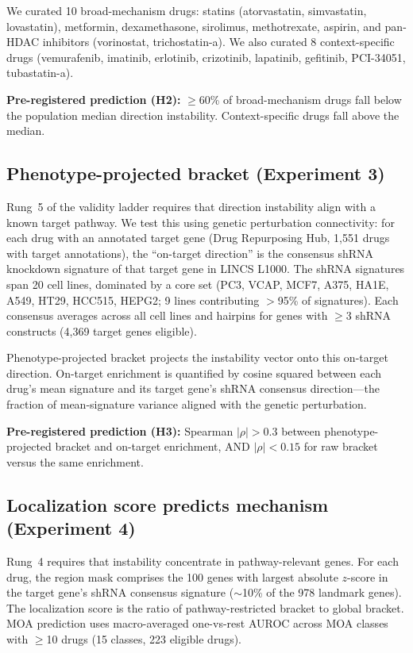 \documentclass{article}
\begin{document}
We curated 10 broad-mechanism drugs: statins (atorvastatin, simvastatin,
lovastatin), metformin, dexamethasone, sirolimus, methotrexate, aspirin,
and pan-HDAC inhibitors (vorinostat, trichostatin-a). We also curated 8
context-specific drugs (vemurafenib, imatinib, erlotinib, crizotinib,
lapatinib, gefitinib, PCI-34051, tubastatin-a).

\textbf{Pre-registered prediction (H2):} $\geq$60\% of broad-mechanism drugs
fall below the population median direction instability. Context-specific
drugs fall above the median.

\subsection{Phenotype-projected bracket (Experiment 3)}

Rung~5 of the validity ladder requires that direction instability align with
a known target pathway. We test this using genetic perturbation connectivity:
for each drug with an annotated target gene (Drug Repurposing Hub,
1{,}551 drugs with target annotations), the ``on-target direction'' is the
consensus shRNA knockdown signature of that target gene in LINCS L1000.
The shRNA signatures span 20 cell lines, dominated by a core set
(PC3, VCAP, MCF7, A375, HA1E, A549, HT29, HCC515, HEPG2; 9 lines
contributing $>$95\% of signatures). Each consensus averages across all
cell lines and hairpins for genes with $\geq$3 shRNA constructs
(4{,}369 target genes eligible).

Phenotype-projected bracket projects the instability vector onto this
on-target direction. On-target enrichment is quantified by cosine squared
between each drug's mean signature and its target gene's shRNA consensus
direction---the fraction of mean-signature variance aligned with the
genetic perturbation.

\textbf{Pre-registered prediction (H3):} Spearman $|\rho| > 0.3$ between
phenotype-projected bracket and on-target enrichment, AND $|\rho| < 0.15$
for raw bracket versus the same enrichment.

\subsection{Localization score predicts mechanism (Experiment 4)}

Rung~4 requires that instability concentrate in pathway-relevant genes.
For each drug, the region mask comprises the 100 genes with largest absolute
$z$-score in the target gene's shRNA consensus signature ($\sim$10\% of the
978 landmark genes). The localization score is the ratio of pathway-restricted
bracket to global bracket. MOA prediction uses macro-averaged one-vs-rest
AUROC across MOA classes with $\geq$10 drugs (15 classes, 223 eligible drugs).
\end{document}
